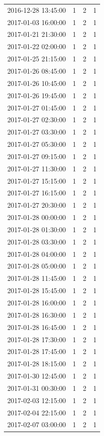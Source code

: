 \begin{tabular}{lrrr}
2016-12-28 13:45:00 & 1 & 2 & 1 \\
2017-01-03 16:00:00 & 1 & 2 & 1 \\
2017-01-21 21:30:00 & 1 & 2 & 1 \\
2017-01-22 02:00:00 & 1 & 2 & 1 \\
2017-01-25 21:15:00 & 1 & 2 & 1 \\
2017-01-26 08:45:00 & 1 & 2 & 1 \\
2017-01-26 10:45:00 & 1 & 2 & 1 \\
2017-01-26 19:45:00 & 1 & 2 & 1 \\
2017-01-27 01:45:00 & 1 & 2 & 1 \\
2017-01-27 02:30:00 & 1 & 2 & 1 \\
2017-01-27 03:30:00 & 1 & 2 & 1 \\
2017-01-27 05:30:00 & 1 & 2 & 1 \\
2017-01-27 09:15:00 & 1 & 2 & 1 \\
2017-01-27 11:30:00 & 1 & 2 & 1 \\
2017-01-27 15:15:00 & 1 & 2 & 1 \\
2017-01-27 16:15:00 & 1 & 2 & 1 \\
2017-01-27 20:30:00 & 1 & 2 & 1 \\
2017-01-28 00:00:00 & 1 & 2 & 1 \\
2017-01-28 01:30:00 & 1 & 2 & 1 \\
2017-01-28 03:30:00 & 1 & 2 & 1 \\
2017-01-28 04:00:00 & 1 & 2 & 1 \\
2017-01-28 05:00:00 & 1 & 2 & 1 \\
2017-01-28 11:45:00 & 1 & 2 & 1 \\
2017-01-28 15:45:00 & 1 & 2 & 1 \\
2017-01-28 16:00:00 & 1 & 2 & 1 \\
2017-01-28 16:30:00 & 1 & 2 & 1 \\
2017-01-28 16:45:00 & 1 & 2 & 1 \\
2017-01-28 17:30:00 & 1 & 2 & 1 \\
2017-01-28 17:45:00 & 1 & 2 & 1 \\
2017-01-28 18:15:00 & 1 & 2 & 1 \\
2017-01-30 12:45:00 & 1 & 2 & 1 \\
2017-01-31 00:30:00 & 1 & 2 & 1 \\
2017-02-03 12:15:00 & 1 & 2 & 1 \\
2017-02-04 22:15:00 & 1 & 2 & 1 \\
2017-02-07 03:00:00 & 1 & 2 & 1 \\

\end{tabular}
